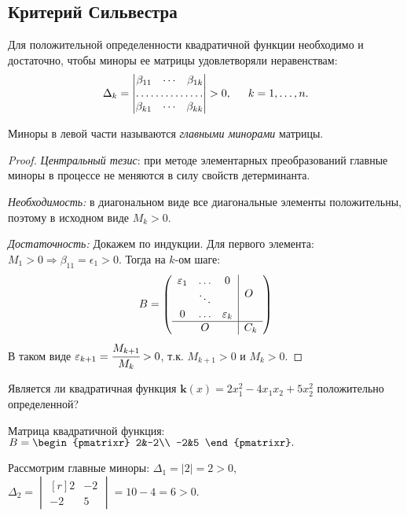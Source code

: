 \subsection{Критерий Сильвестра}
\begin{theorem}
Для положительной определенности квадратичной функции необходимо и достаточно, чтобы миноры ее матрицы удовлетворяли неравенствам:$$\Delta_k=\begin{vmatrix*}[r]
\beta_{11} & \cdots & \beta_{1k}\\
\hdotsfor{3}\\
\beta_{k1} & \cdots & \beta_{kk}
\end{vmatrix*}>0,\hspace{15pt} k=1,\ldots, n.$$

Миноры в левой части называются \textit{главными минорами} матрицы.
\end{theorem}
\begin{proof}
\emph{Центральный тезис}: при методе элементарных преобразований главные миноры в процессе не меняются в силу свойств детерминанта.

\textit{Необходимость:} в диагональном виде все диагональные элементы положительны, поэтому в исходном виде $M_k>0$.

\textit{Достаточность:} Докажем по индукции. Для первого элемента: $ M_1>0 \Rightarrow \beta_{11}=\epsilon_1>0 $. Тогда на $k$-ом шаге:
$$
B = \left(
\begin{array}{ccc|c}
\epsilon_1 & \dots & 0 &\multirow{3}{0.4cm}{$O$}\\
&\ddots& &\\
0&\hdots&\epsilon_k& \\
\hline
\multicolumn{3}{c|}{O}& C_k\\
\end{array}\right)
$$
В таком виде $ \epsilon_{k+1}=\cfrac{M_{k+1}}{M_k} > 0 $, т.к. $ M_{k+1}>0 $ и $ M_k>0 $.
\end{proof}


\begin{prim}
Является ли квадратичная функция $\textbf{k}(x)=2x^2_1-4x_1x_2+5x^2_2$ положительно определенной?
\end{prim}
Матрица квадратичной функция: $B=\begin{pmatrixr}
2&-2\\
-2&5
\end{pmatrixr}.$

Рассмотрим главные миноры: $\Delta_1=|2|=2>0$, $\Delta_2=\begin{vmatrix*}[r]
2&-2\\
-2&5
\end{vmatrix*}=10-4=6>0.$\\

